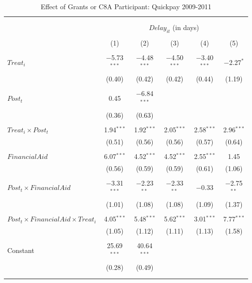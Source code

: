 \documentclass[]{article}
\begin{document}
\begin{table}[H] \centering 
  \caption{Effect of Grants or C8A Participant: Quickpay 2009-2011} 
  \label{} 
\small 
\begin{tabular}{@{\extracolsep{-2pt}}lccccc} 
\\[-1.8ex]\hline 
\hline \\[-1.8ex] 
\\[-1.8ex] & \multicolumn{5}{c}{$Delay_{it}$ (in days)} \\ 
\\[-1.8ex] & (1) & (2) & (3) & (4) & (5)\\ 
\hline \\[-1.8ex] 
 $Treat_i$ & $-$5.73$^{***}$ & $-$4.48$^{***}$ & $-$4.50$^{***}$ & $-$3.40$^{***}$ & $-$2.27$^{*}$ \\ 
  & (0.40) & (0.42) & (0.42) & (0.44) & (1.19) \\ 
  & & & & & \\ 
 $Post_t$ & 0.45 & $-$6.84$^{***}$ &  &  &  \\ 
  & (0.36) & (0.63) &  &  &  \\ 
  & & & & & \\ 
 $Treat_i \times Post_t$ & 1.94$^{***}$ & 1.92$^{***}$ & 2.05$^{***}$ & 2.58$^{***}$ & 2.96$^{***}$ \\ 
  & (0.51) & (0.56) & (0.56) & (0.57) & (0.64) \\ 
  & & & & & \\ 
 $FinancialAid$ & 6.07$^{***}$ & 4.52$^{***}$ & 4.52$^{***}$ & 2.55$^{***}$ & 1.45 \\ 
  & (0.56) & (0.59) & (0.59) & (0.61) & (1.06) \\ 
  & & & & & \\ 
 $Post_t \times FinancialAid$ & $-$3.31$^{***}$ & $-$2.23$^{**}$ & $-$2.33$^{**}$ & $-$0.33 & $-$2.75$^{**}$ \\ 
  & (1.01) & (1.08) & (1.08) & (1.09) & (1.37) \\ 
  & & & & & \\ 
 $Post_t \times FinancialAid \times Treat_i$ & 4.05$^{***}$ & 5.48$^{***}$ & 5.62$^{***}$ & 3.01$^{***}$ & 7.77$^{***}$ \\ 
  & (1.05) & (1.12) & (1.11) & (1.13) & (1.58) \\ 
  & & & & & \\ 
 Constant & 25.69$^{***}$ & 40.64$^{***}$ &  &  &  \\ 
  & (0.28) & (0.49) &  &  &  \\ 
  & & & & & \\ 
\hline \\[-1.8ex] 

\end{tabular}
\end{table}
\end{document}
